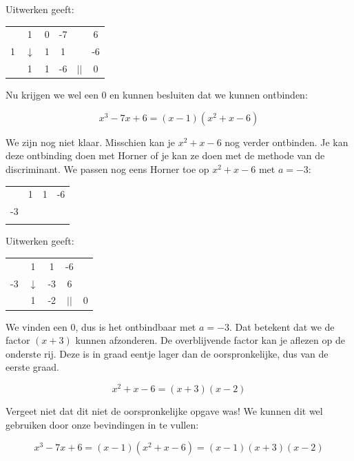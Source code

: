 \begin{voorbeeld}
Uitwerken geeft:

\begin{center}
	\begin{tabular}{c|ccccc}
		& 1 & 0 & -7 & & 6 \\
		1 & $\downarrow$ & 1 & 1 & & -6\\
		\hline 
		& 1 & 1 & -6 & $||$ & 0
	\end{tabular}
\end{center}

Nu krijgen we wel een 0 en kunnen besluiten dat we kunnen ontbinden:

\begin{equation*}
x^3-7x+6=(x-1)(x^2+x-6)
\end{equation*}

We zijn nog niet klaar. Misschien kan je $x^2+x-6$ nog verder ontbinden. Je kan deze ontbinding doen met Horner of je kan ze doen met de methode van de discriminant. We passen nog eens Horner toe op $x^2+x-6$ met $a=-3$:

\begin{center}
	\begin{tabular}{c|ccc}
		& 1 & 1 & -6  \\
		-3 &  &  &  \\
		\hline 
		&  &  &  
	\end{tabular}
\end{center}

Uitwerken geeft:

\begin{center}
	\begin{tabular}{c|cccc}
		& 1 & 1 & -6 & \\
		-3 & $\downarrow$ & -3 & 6 &\\
		\hline 
		& 1 & -2 & $||$  & 0
	\end{tabular}
\end{center}


We vinden een 0, dus is het ontbindbaar met $a=-3$. Dat betekent dat we de factor $(x+3)$ kunnen afzonderen. De overblijvende factor kan je aflezen op de onderste rij. Deze is in graad eentje lager dan de oorspronkelijke, dus van de eerste graad.

\begin{equation*}
x^2+x-6=(x+3)(x-2)
\end{equation*}

Vergeet niet dat dit niet de oorspronkelijke opgave was! We kunnen dit wel gebruiken door onze bevindingen in te vullen:

\begin{equation*}
x^3-7x+6=(x-1)(x^2+x-6)=(x-1)(x+3)(x-2)
\end{equation*}


\end{voorbeeld}
